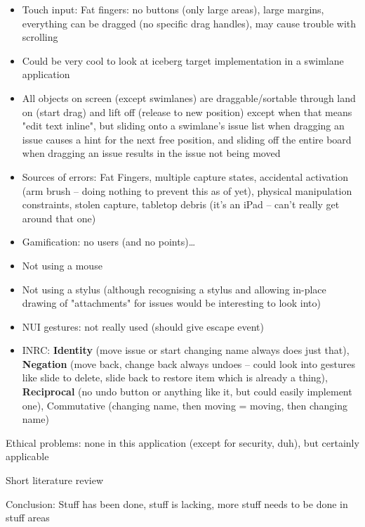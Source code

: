 \begin{itemize}
  \item Touch input: Fat fingers: no buttons (only large areas), large margins, everything can be dragged (no specific drag handles), may cause trouble with scrolling
  \item Could be very cool to look at iceberg target implementation in a swimlane application %
  \item All objects on screen (except swimlanes) are draggable/sortable through land on (start drag) and lift off (release to new position) except when that means "edit text inline", but sliding onto a swimlane's issue list when dragging an issue causes a hint for the next free position, and sliding off the entire board when dragging an issue results in the issue not being moved %
  \item Sources of errors: Fat Fingers, multiple capture states, accidental activation (arm brush – doing nothing to prevent this as of yet), physical manipulation constraints, stolen capture, tabletop debris (it's an iPad – can't really get around that one)
  \item Gamification: no users (and no points)\dots %
  \item Not using a mouse
  \item Not using a stylus (although recognising a stylus and allowing in-place drawing of "attachments" for issues would be interesting to look into)
  \item NUI gestures: not really used (should give escape event)
  \item INRC: \textbf{Identity} (move issue or start changing name always does just that), \textbf{Negation} (move back, change back always undoes – could look into gestures like slide to delete, slide back to restore item which is already a thing), \textbf{Reciprocal} (no undo button or anything like it, but could easily implement one), Commutative (changing name, then moving = moving, then changing name) %
\end{itemize}

Ethical problems: none in this application (except for security, duh), but certainly applicable %

Short literature review %

Conclusion: Stuff has been done, stuff is lacking, more stuff needs to be done in stuff areas